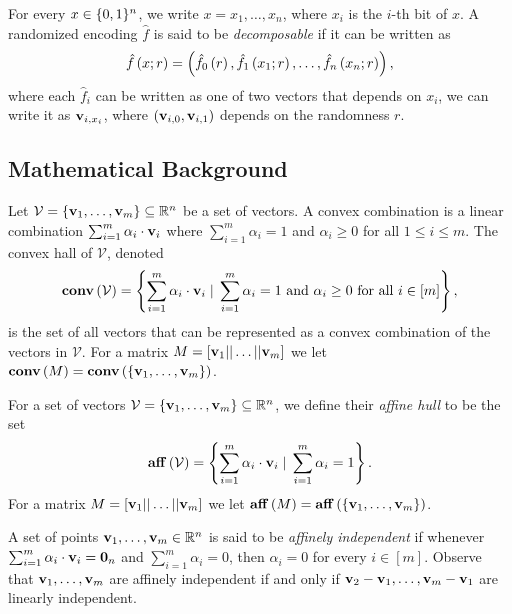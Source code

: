 \documentclass{llncs}
\newcommand{\V}{\mathcal{V}}
\newcommand{\affine}[1]{\normalfont{\mathbf{aff}}\of{#1}}
\newcommand{\aff}[1]{\affine{#1}}
\newcommand{\CH}[1]{\normalfont{\mathbf{conv}\of{#1}}}
\renewcommand{\v}{\myvec{v}}
\newcommand{\zeros}{\normalfont{\textbf{0}}}
\begin{document}
\begin{definition}
For every $x\in\{0,1\}^n$, we write $x=x_1,\ldots,x_n$, where $x_i$ is the $i$-th bit of $x$. A randomized encoding $\hat{f}$ is said to be \emph{decomposable} if it can be written as $$\hat{f}\left ( x;r \right )=\left ( \hat{f}_0\left ( r \right ),\hat{f}_1\left ( x_1;r \right ),\ldots,\hat{f}_n\left ( x_n;r \right ) \right ),$$
where each $\hat{f}_i$ can be written as one of two vectors that depends on $x_i$, \ie we can write it as $\v_{i,x_i}$, where $(\v_{i,0},\v_{i,1})$ depends on the randomness $r$.
\end{definition}

\subsection{Mathematical Background}
\begin{definition}
Let $\V=\{\v_1,\ldots,\v_m\}\subseteq\R^n$ be a set of vectors. A convex combination is a linear combination $\sum_{i=1}^m \alpha_i\cdot\v_i$ where $\sum_{i=1}^m\alpha_i=1$ and $\alpha_i\geq 0$ for all $1\leq i\leq m$. The convex hall of $\V$, denoted
$$\CH{\V}=\set{\sum_{i=1}^m\alpha_i\cdot\v_i\cond \sum_{i=1}^m\alpha_i=1\text{ and } \alpha_i\geq 0 \text{ for all } i\in[m]},$$ 
is the set of all vectors that can be represented as a convex combination of the vectors in $\V$. For a matrix $M=[\v_1||\ldots||\v_m]$ we let $\CH{M}=\CH{\set{\v_1,\ldots,\v_m}}$.
\end{definition}

\begin{definition}
	For a set of vectors $\V=\{\v_1,\ldots,\v_m\}\subseteq\R^n$, we define their \emph{affine hull} to be the set
    $$\aff{\V}=\set{\sum_{i=1}^m\alpha_i\cdot\v_i\cond \sum_{i=1}^m\alpha_i=1}.$$
    For a matrix $M=[\v_1||\ldots||\v_m]$ we let $\aff{M}=\aff{\set{\v_1,\ldots,\v_m}}$.
\end{definition}

\begin{definition}
A set of points $\v_1,\ldots,\v_m\in\R^n$ is said to be \emph{affinely independent} if whenever $\sum_{i=1}^m\alpha_i\cdot\v_i=\zeros_n$ and $\sum_{i=1}^m\alpha_i=0$, then $\alpha_i=0$ for every $i\in[m]$. Observe that $\v_1,\ldots,\v_m$ are affinely independent if and only if $\v_2-\v_1,\ldots,\v_m-\v_1$ are linearly independent.
\end{definition}
\end{document}
